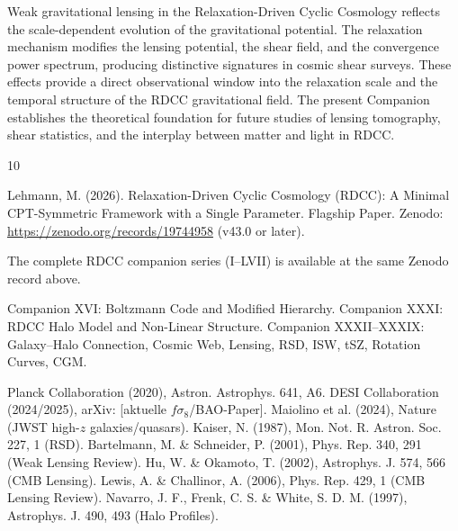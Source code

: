 \documentclass[11pt,a4paper]{article}
\begin{document}
Weak gravitational lensing in the Relaxation-Driven Cyclic Cosmology reflects the 
scale-dependent evolution of the gravitational potential. The relaxation mechanism 
modifies the lensing potential, the shear field, and the convergence power 
spectrum, producing distinctive signatures in cosmic shear surveys. These effects 
provide a direct observational window into the relaxation scale and the temporal 
structure of the RDCC gravitational field. The present Companion establishes the 
theoretical foundation for future studies of lensing tomography, shear statistics, 
and the interplay between matter and light in RDCC.


\begin{thebibliography}{10}

 Lehmann, M. (2026). Relaxation-Driven Cyclic Cosmology (RDCC): A Minimal CPT-Symmetric Framework with a Single Parameter. Flagship Paper. Zenodo: \url{https://zenodo.org/records/19744958} (v43.0 or later).

 The complete RDCC companion series (I--LVII) is available at the same Zenodo record above.

 Companion XVI: Boltzmann Code and Modified Hierarchy.
 Companion XXXI: RDCC Halo Model and Non-Linear Structure.
 Companion XXXII--XXXIX: Galaxy--Halo Connection, Cosmic Web, Lensing, RSD, ISW, tSZ, Rotation Curves, CGM.

 Planck Collaboration (2020), Astron. Astrophys. 641, A6.
 DESI Collaboration (2024/2025), arXiv: [aktuelle $f\sigma_8$/BAO-Paper].
 Maiolino et al. (2024), Nature (JWST high-$z$ galaxies/quasars).
 Kaiser, N. (1987), Mon. Not. R. Astron. Soc. 227, 1 (RSD).
 Bartelmann, M. \& Schneider, P. (2001), Phys. Rep. 340, 291 (Weak Lensing Review).
 Hu, W. \& Okamoto, T. (2002), Astrophys. J. 574, 566 (CMB Lensing).
 Lewis, A. \& Challinor, A. (2006), Phys. Rep. 429, 1 (CMB Lensing Review).
 Navarro, J. F., Frenk, C. S. \& White, S. D. M. (1997), Astrophys. J. 490, 493 (Halo Profiles).

\end{thebibliography}
\end{document}
